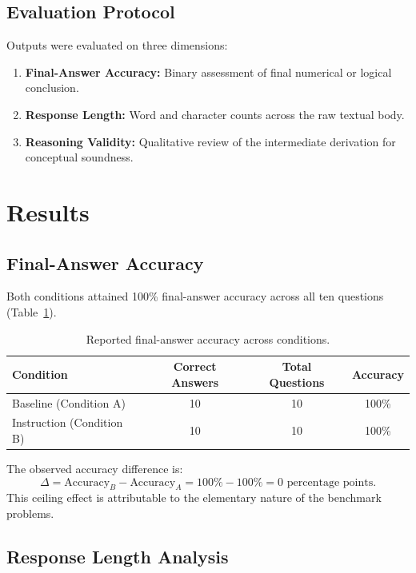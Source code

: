 \documentclass[11pt,a4paper]{article}
\begin{document}
\subsection{Evaluation Protocol}
Outputs were evaluated on three dimensions:
\begin{enumerate}[leftmargin=*]
    \item \textbf{Final-Answer Accuracy:} Binary assessment of final numerical or logical conclusion.
    \item \textbf{Response Length:} Word and character counts across the raw textual body.
    \item \textbf{Reasoning Validity:} Qualitative review of the intermediate derivation for conceptual soundness.
\end{enumerate}

\section{Results}

\subsection{Final-Answer Accuracy}

Both conditions attained 100\% final-answer accuracy across all ten questions (Table~\ref{tab:accuracy}).

\begin{table}[h]
\centering
\begin{tabular}{lccc}
\toprule
\textbf{Condition} & \textbf{Correct Answers} & \textbf{Total Questions} & \textbf{Accuracy} \\
\midrule
Baseline (Condition A)      & 10 & 10 & 100\% \\
Instruction (Condition B)   & 10 & 10 & 100\% \\
\bottomrule
\end{tabular}
\caption{Reported final-answer accuracy across conditions.}
\label{tab:accuracy}
\end{table}

The observed accuracy difference is:
\[
\Delta = \text{Accuracy}_{B} - \text{Accuracy}_{A} = 100\% - 100\% = 0\text{ percentage points}.
\]
This ceiling effect is attributable to the elementary nature of the benchmark problems.

\subsection{Response Length Analysis}
\end{document}
